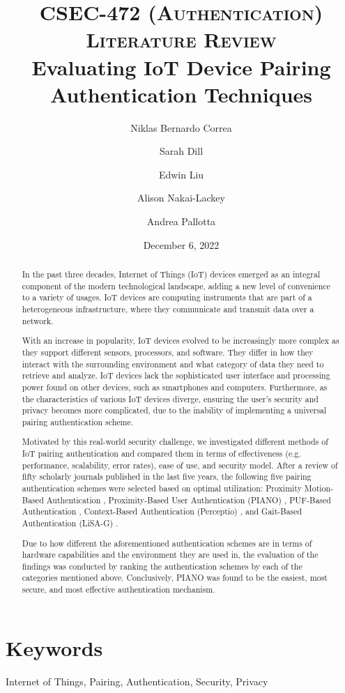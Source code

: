 \documentclass[10pt,twocolumn,letterpaper]{article}
\title{
		\usefont{OT1}{bch}{b}{n}
		\normalfont \normalsize \textsc{CSEC-472 (Authentication) Literature Review} \\ [14pt]
		\huge Evaluating IoT Device Pairing Authentication Techniques \\
}
\author[1]{Niklas Bernardo Correa}
\author[1]{Sarah Dill}
\author[2]{Edwin Liu}
\author[1]{Alison Nakai-Lackey}
\author[3]{Andrea Pallotta}
\affil[1]{\small{Cyber Security Department, Rochester Institute of Technology}}
\affil[2]{Computer Science Department, Rochester Institute of Technology}
\affil[3]{Web and Mobile Computing Department, Rochester Institute of Technology}
\date{December 6, 2022}
\begin{document}
\maketitle

\begin{abstract}
In the past three decades, Internet of Things (IoT) devices emerged as an integral component of the modern technological landscape, adding a new level of convenience to a variety of usages. IoT devices are computing instruments that are part of a heterogeneous infrastructure, where they communicate and transmit data over a network. 

With an increase in popularity, IoT devices evolved to be increasingly more complex as they support different sensors, processors, and software. They differ in how they interact with the surrounding environment and what category of data they need to retrieve and analyze. IoT devices lack the sophisticated user interface and processing power found on other devices, such as smartphones and computers. Furthermore, as the characteristics of various IoT devices diverge, ensuring the user’s security and privacy becomes more complicated, due to the inability of implementing a universal pairing authentication scheme.

Motivated by this real-world security challenge, we investigated different methods of IoT pairing authentication and compared them in terms of effectiveness (e.g. performance, scalability, error rates), ease of use, and security model. After a review of fifty scholarly journals published in the last five years, the following five pairing authentication schemes were selected based on optimal utilization: Proximity Motion-Based Authentication \cite{proxmotion}, Proximity-Based User Authentication (PIANO) \cite{piano}, PUF-Based Authentication \cite{puf}, Context-Based Authentication (Perceptio) \cite{perceptio}, and Gait-Based Authentication (LiSA-G) \cite{lisag}. 

Due to how different the aforementioned authentication schemes are in terms of hardware capabilities and the environment they are used in, the evaluation of the findings was conducted by ranking the authentication schemes by each of the categories mentioned above. Conclusively, PIANO \cite{piano} was found to be the easiest, most secure, and most effective authentication mechanism.
\end{abstract}

\section*{Keywords}
Internet of Things, Pairing, Authentication, Security, Privacy
\end{document}

